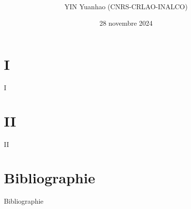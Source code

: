\documentclass[hyperref={colorlinks=true, linkcolor=blue, anchorcolor=blue, citecolor=blue, urlcolor=red}]{beamer}
\title[]{\textbf{}}%
\author[]{YIN Yuanhao (CNRS-CRLAO-INALCO)}%
\date[\textcolor{white}{\today} ]
{28 novembre 2024}%
\begin{document}
\frame{\titlepage}

\section{\textbf{I}}
\begin{frame}{I}
    
\end{frame}

\section{\textbf{II}}
\begin{frame}{II}

\end{frame}

\section*{\textbf{Bibliographie}}
\begin{frame}[allowframebreaks]{Bibliographie}
    \printbibliography
\end{frame}
\end{document}

